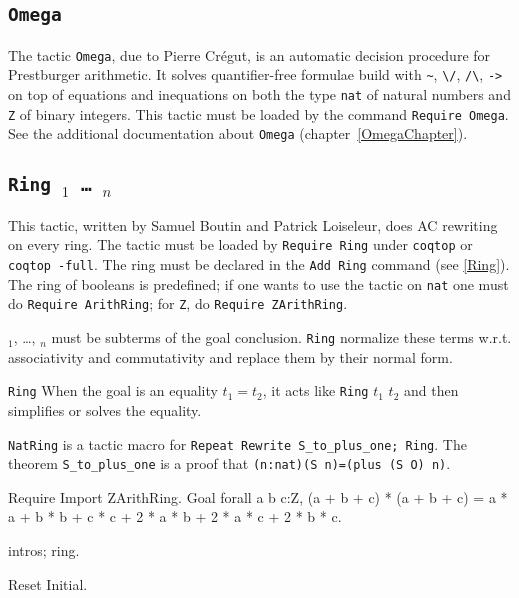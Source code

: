\subsection{\tt Omega}
\label{Omega}

The tactic \texttt{Omega}, due to Pierre Cr{\'e}gut,
is an automatic decision procedure for Prestburger
arithmetic. It solves quantifier-free 
formulae build with \verb|~|, \verb|\/|, \verb|/\|,
\verb|->| on top of equations and inequations on
both the type \texttt{nat} of natural numbers and \texttt{Z} of binary
integers. This tactic must be loaded by the command \texttt{Require
  Omega}. See the additional documentation about \texttt{Omega}
(chapter~\ref{OmegaChapter}).

\subsection{\tt Ring \term$_1$ \dots\ \term$_n$}

This tactic, written by Samuel Boutin and Patrick Loiseleur, 
does AC rewriting on every
ring. The tactic must be loaded by \texttt{Require Ring} under
\texttt{coqtop} or \texttt{coqtop -full}.
The ring must be declared in the \texttt{Add Ring}
command (see \ref{Ring}). The ring of booleans is predefined; if one
wants to use the tactic on \texttt{nat} one must do \texttt{Require
  ArithRing}; for \texttt{Z}, do \texttt{Require ZArithRing}.

\term$_1$, \dots, \term$_n$ must be subterms of the goal
conclusion. \texttt{Ring} normalize these terms
w.r.t. associativity and commutativity and replace them by their
normal form.

\begin{Variants}
\item \texttt{Ring} When the goal is an equality $t_1=t_2$, it
  acts like \texttt{Ring} $t_1$ $t_2$ and then simplifies or solves
  the equality.

\item \texttt{NatRing} is a tactic macro for \texttt{Repeat Rewrite
    S\_to\_plus\_one; Ring}. The theorem \texttt{S\_to\_plus\_one} is a
  proof that \texttt{(n:nat)(S n)=(plus (S O) n)}.

\end{Variants}

\Example
\begin{coq_example*}
Require Import ZArithRing.
Goal
forall a b c:Z,
  (a + b + c) * (a + b + c) =
  a * a + b * b + c * c + 2 * a * b + 2 * a * c + 2 * b * c.
\end{coq_example*}
\begin{coq_example}
intros; ring.
\end{coq_example}
\begin{coq_eval}
Reset Initial.
\end{coq_eval}


